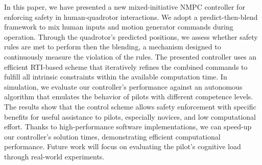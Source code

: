 In this paper, we have presented a new mixed-initiative NMPC controller for enforcing safety in human-quadrotor interactions. We adopt a predict-then-blend framework to mix human inputs and motion generator commands during operation. Through the quadrotor's predicted positions, we assess whether safety rules are met to perform then the blending, a mechanism designed to continuously measure the violation of the rules. The presented controller uses an efficient RTI-based scheme that iteratively refines the combined commands to fulfill all intrinsic constraints within the available computation time. In simulation, we evaluate our controller's performance against an autonomous algorithm that emulates the behavior of pilots with different competence levels. The results show that the control scheme allows safety enforcement with specific benefits for useful assistance to pilots, especially novices, and low computational effort. Thanks to high-performance software implementations, we can speed-up our controller's solution times, demonstrating efficient computational performance. Future work will focus on evaluating the pilot's cognitive load through real-world experiments.